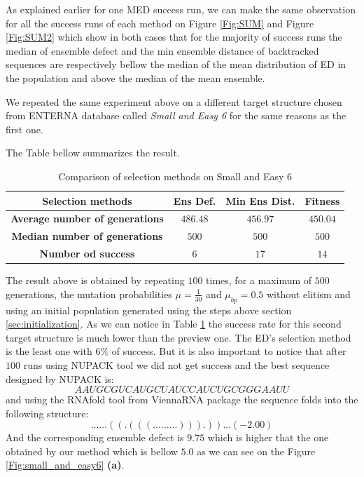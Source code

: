 \documentclass[english,12pt,a4paper]{article}
\theoremstyle{definition}
\begin{document}
As explained earlier for one MED success run, we can make the same observation for all the success runs of each method on Figure \ref{Fig:SUM} and Figure \ref{Fig:SUM2} which show in both cases that for the majority of success runs the median of ensemble defect and the min ensemble distance of backtracked sequences are respectively bellow the median of the mean distribution of ED in the population and above  the median of the mean ensemble. 

We repeated the same experiment above on a different target structure chosen from ENTERNA database called \textit{Small and Easy 6 }for the same reasons as the first one.

The Table bellow summarizes the result. 

\begin{table}[H]
	\caption{Comparison of selection methods on Small and Easy 6} \label{table2}
	\hspace{1cm}
	\begin{tabular}[H]{|c|c|c|c|}%
		\hline
		\textbf{Selection methods}& Ens Def. & Min Ens Dist. & Fitness\\%
		\hline
		\textbf{Average number of generations}&$486.48$&$456.97$&$450.04$\\%
		\hline
		\textbf{Median number of generations}&$500$&$500$&$500$\\ %
		\hline
		\textbf{Number od success}&$6$&$17$&$14$\\%
		\hline
		
	\end{tabular}
\end{table}
\medskip
\small 
The result above is obtained by repeating $100$ times, for a maximum of $500$ generations, the mutation probabilities $\mu = \frac{1}{30}$ and $\mu_{bp} = 0.5$ without elitism and using an initial population generated using the steps above section  \ref{sec:initialization}.  As we can notice in Table \ref{table2} the success rate for this second target structure is much lower than the preview one. The ED's selection method is the least one with $6\%$ of success. But it is also important to notice that after $100$ runs using  NUPACK tool we did not get success and the best sequence designed by NUPACK is: 
$$AAUGCGUCAUGCUAUCCAUCUGCGGGAAUU$$ and using the RNAfold tool from ViennaRNA package the sequence folds into the following structure:
$$......((.(((.........))).))... ( -2.00)$$
And the corresponding  ensemble defect is $9.75$ which is higher that the one obtained by our method which is bellow $5.0$ as we can see on the Figure \ref{Fig:small_and_easy6} \textbf{(a)}. 
\end{document}
